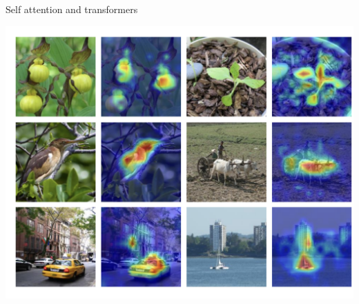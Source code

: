 \documentclass{beamer}
\begin{document}
\begin{frame}{Self attention and transformers}
    \begin{center}
        \includegraphics[scale=0.5]{pics/self_attention.pdf}
    \end{center}
\end{frame}
\end{document}
